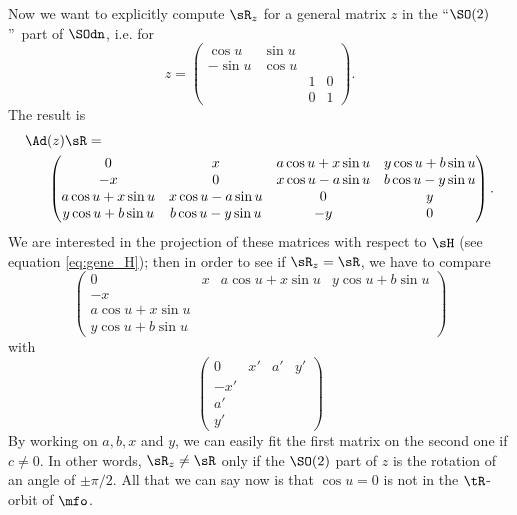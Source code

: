 Now we want to explicitly compute $\sR_z$ for a general matrix $z$ in the ``$\SO(2)$''\ part of $\SOdn$, i.e. for
\[
	z=
	\begin{pmatrix}
		\cos u  & \sin u         \\
		-\sin u & \cos u         \\
		        &        & 1 & 0 \\
		        &        & 0 & 1
	\end{pmatrix}.
\]
The result is
\begin{equation}
	\begin{split}
		\Ad & (z)\sR=                                                                \\
		    & \begin{pmatrix}
			      0               & x                & a\cos u+x\sin u & y\cos u+b\sin u \\
			      -x              & 0                & x\cos u-a\sin u & b\cos u-y\sin u \\
			      a\cos u+x\sin u & x\cos u -a\sin u & 0               & y               \\
			      y\cos u+b\sin u & b\cos u-y\sin u  & -y              & 0
		      \end{pmatrix}.
	\end{split}
\end{equation}
We are interested in the projection of these matrices with respect to $\sH$ (see equation \eqref{eq:gene_H}); then in order to see if $\sR_z=\sR$, we have to compare
\[
	\begin{pmatrix}
		0                & x & a\cos u+x\sin u & y\cos u+b\sin u \\
		-x               &   &                 &                 \\
		a\cos u+x\sin u  &   &                 &                 \\
		y \cos u+b\sin u &   &                 &
	\end{pmatrix}
\]
with
\[
	\begin{pmatrix}
		0   & x' & a' & y' \\
		-x' &    &    &    \\
		a'  &    &    &    \\
		y'  &    &    &
	\end{pmatrix}
\]
By working on $a,b,x$ and $y$, we can easily fit the first matrix on the second
one if $c\neq 0$. In other words, $\sR_z\neq\sR$ only if the $\SO(2)$
part of $z$ is the rotation of an angle of $\pm\pi/2$. All that we can say now is that $\cos u=0$ is  not in the $\tR$-orbit of $\mfo$.

